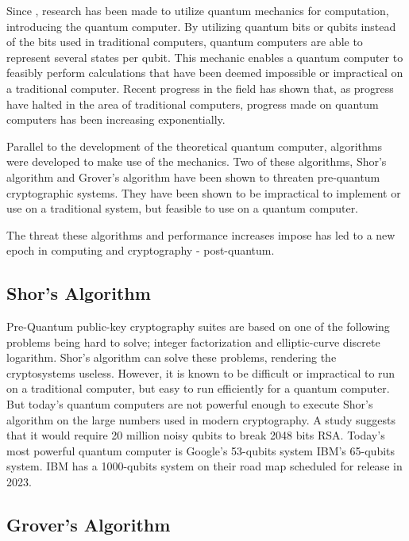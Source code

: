 Since , research has been made to utilize quantum mechanics for computation, introducing the quantum computer. By utilizing quantum bits or qubits instead of the bits used in traditional computers, quantum computers are able to represent several states per qubit. This mechanic enables a quantum computer to feasibly perform calculations that have been deemed impossible or impractical on a traditional computer. Recent progress in the field has shown that, as progress have halted in the area of traditional computers, progress made on quantum computers has been increasing exponentially.

Parallel to the development of the theoretical quantum computer, algorithms were developed to make use of the mechanics. Two of these algorithms, Shor's algorithm and Grover's algorithm have been shown to threaten pre-quantum cryptographic systems. They have been shown to be impractical to implement or use on a traditional system, but feasible to use on a quantum computer.

The threat these algorithms and performance increases impose has led to a new epoch in computing and cryptography - post-quantum.

\subsection{Shor's Algorithm}

Pre-Quantum public-key cryptography suites are based on one of the following problems being hard to solve; integer factorization and elliptic-curve discrete logarithm. Shor's algorithm can solve these problems, rendering the cryptosystems useless\cite{shor1997}. However, it is known to be difficult or impractical to run on a traditional computer, but easy to run efficiently for a quantum computer. But today's quantum computers are not powerful enough to execute Shor's algorithm on the large numbers used in modern cryptography\cite{bernstein2017}. A study \cite{gidney2019} suggests that it would require 20 million noisy qubits to break 2048 bits RSA. Today's most powerful quantum computer is Google's 53-qubits system\cite{google2019:quantum-computer} IBM's 65-qubits system\cite{ibm2020:quantum-computer}. IBM has a 1000-qubits system on their road map scheduled for release in 2023\cite{ibm2020:quantum-computer}.

\subsection{Grover's Algorithm}

